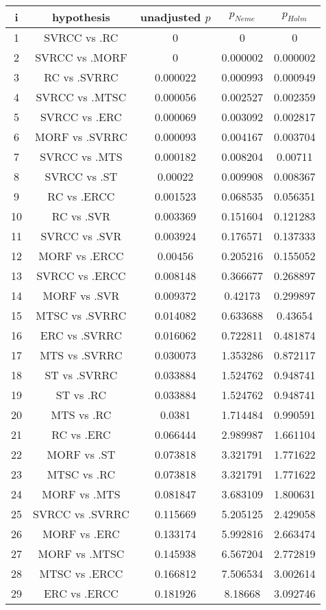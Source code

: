 \documentclass[a4paper,10pt]{article}
\begin{document}
\begin{landscape}
\begin{table}[!htp]
\centering\scriptsize
\begin{tabular}{ccccc}
i&hypothesis&unadjusted $p$&$p_{Neme}$&$p_{Holm}$\\
\hline1&SVRCC vs .RC&0&0&0\\
2&SVRCC vs .MORF&0&0.000002&0.000002\\
3&RC vs .SVRRC&0.000022&0.000993&0.000949\\
4&SVRCC vs .MTSC&0.000056&0.002527&0.002359\\
5&SVRCC vs .ERC&0.000069&0.003092&0.002817\\
6&MORF vs .SVRRC&0.000093&0.004167&0.003704\\
7&SVRCC vs .MTS&0.000182&0.008204&0.00711\\
8&SVRCC vs .ST&0.00022&0.009908&0.008367\\
9&RC vs .ERCC&0.001523&0.068535&0.056351\\
10&RC vs .SVR&0.003369&0.151604&0.121283\\
11&SVRCC vs .SVR&0.003924&0.176571&0.137333\\
12&MORF vs .ERCC&0.00456&0.205216&0.155052\\
13&SVRCC vs .ERCC&0.008148&0.366677&0.268897\\
14&MORF vs .SVR&0.009372&0.42173&0.299897\\
15&MTSC vs .SVRRC&0.014082&0.633688&0.43654\\
16&ERC vs .SVRRC&0.016062&0.722811&0.481874\\
17&MTS vs .SVRRC&0.030073&1.353286&0.872117\\
18&ST vs .SVRRC&0.033884&1.524762&0.948741\\
19&ST vs .RC&0.033884&1.524762&0.948741\\
20&MTS vs .RC&0.0381&1.714484&0.990591\\
21&RC vs .ERC&0.066444&2.989987&1.661104\\
22&MORF vs .ST&0.073818&3.321791&1.771622\\
23&MTSC vs .RC&0.073818&3.321791&1.771622\\
24&MORF vs .MTS&0.081847&3.683109&1.800631\\
25&SVRCC vs .SVRRC&0.115669&5.205125&2.429058\\
26&MORF vs .ERC&0.133174&5.992816&2.663474\\
27&MORF vs .MTSC&0.145938&6.567204&2.772819\\
28&MTSC vs .ERCC&0.166812&7.506534&3.002614\\
29&ERC vs .ERCC&0.181926&8.18668&3.092746\\

\end{tabular}
\end{table}
\end{landscape}
\end{document}
